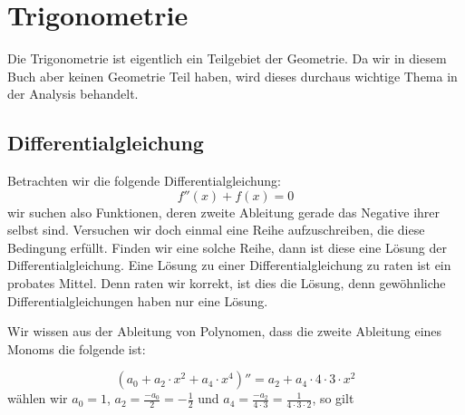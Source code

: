 
\chapter{Trigonometrie}

Die Trigonometrie ist eigentlich ein Teilgebiet der Geometrie. Da wir in diesem Buch aber keinen Geometrie Teil haben, wird dieses durchaus wichtige Thema in der Analysis behandelt. 

\section{Differentialgleichung}

Betrachten wir die folgende Differentialgleichung:
\begin{equation}\label{eq:diffsincos}
f''(x) + f(x) =0
\end{equation}
wir suchen also Funktionen, deren zweite Ableitung gerade das Negative ihrer selbst sind. Versuchen wir doch einmal eine Reihe aufzuschreiben, die diese Bedingung erfüllt. Finden wir eine solche Reihe, dann ist diese eine Lösung der Differentialgleichung. Eine Lösung zu einer Differentialgleichung zu raten ist ein probates Mittel. Denn raten wir korrekt, ist dies die Lösung, denn gewöhnliche Differentialgleichungen haben nur eine Lösung.

Wir wissen aus der Ableitung von Polynomen, dass die zweite Ableitung eines Monoms die folgende ist:

\begin{equation}
\left(a_0 + a_2\cdot x^2 + a_4 \cdot x^4 \right)'' = a_2 + a_4 \cdot 4\cdot 3 \cdot x^2
\end{equation}
wählen wir $a_0=1$, $a_2 = \frac{-a_0}{2}=-\frac{1}{2}$ und $a_4 = \frac{-a_2}{4\cdot 3}= \frac{1}{4\cdot 3\cdot 2}$, so gilt 

